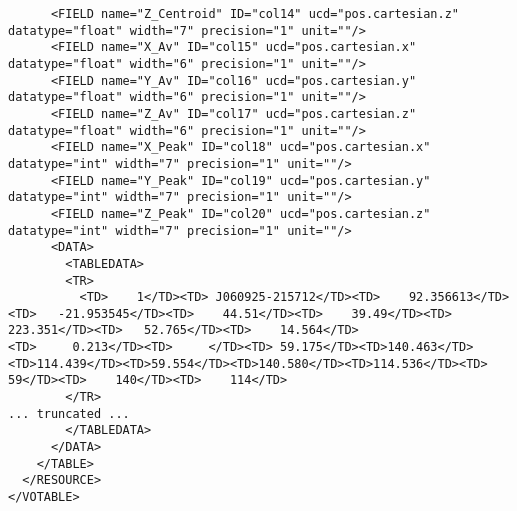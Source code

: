 \begin{landscape}
{\begin{verbatim}
      <FIELD name="Z_Centroid" ID="col14" ucd="pos.cartesian.z" datatype="float" width="7" precision="1" unit=""/>
      <FIELD name="X_Av" ID="col15" ucd="pos.cartesian.x" datatype="float" width="6" precision="1" unit=""/>
      <FIELD name="Y_Av" ID="col16" ucd="pos.cartesian.y" datatype="float" width="6" precision="1" unit=""/>
      <FIELD name="Z_Av" ID="col17" ucd="pos.cartesian.z" datatype="float" width="6" precision="1" unit=""/>
      <FIELD name="X_Peak" ID="col18" ucd="pos.cartesian.x" datatype="int" width="7" precision="1" unit=""/>
      <FIELD name="Y_Peak" ID="col19" ucd="pos.cartesian.y" datatype="int" width="7" precision="1" unit=""/>
      <FIELD name="Z_Peak" ID="col20" ucd="pos.cartesian.z" datatype="int" width="7" precision="1" unit=""/>
      <DATA>
        <TABLEDATA>
        <TR>
          <TD>    1</TD><TD> J060925-215712</TD><TD>    92.356613</TD><TD>   -21.953545</TD><TD>    44.51</TD><TD>    39.49</TD><TD>  223.351</TD><TD>   52.765</TD><TD>    14.564</TD>
<TD>     0.213</TD><TD>     </TD><TD> 59.175</TD><TD>140.463</TD><TD>114.439</TD><TD>59.554</TD><TD>140.580</TD><TD>114.536</TD><TD>     59</TD><TD>    140</TD><TD>    114</TD>
        </TR>
... truncated ...
        </TABLEDATA>
      </DATA>
    </TABLE>
  </RESOURCE>
</VOTABLE>
  \end{verbatim}
}
\end{landscape}